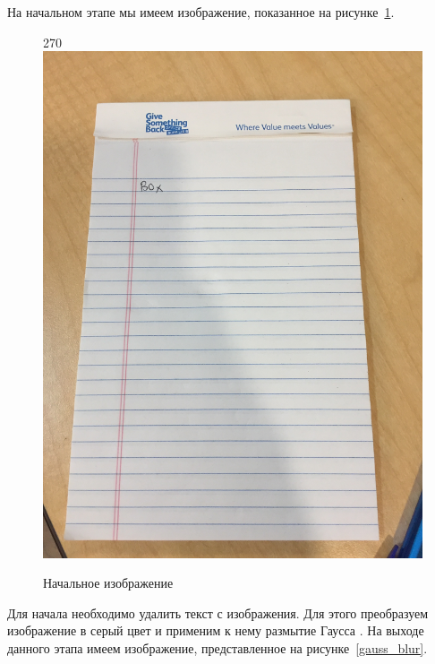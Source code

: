 На начальном этапе мы имеем изображение, показанное на рисунке~\ref{input}.

\begin{figure}
    \begin{turn}{270}
        \includegraphics[scale=0.05]{img/perspective/input.JPG}
    \end{turn}
    \caption{Начальное изображение}
    \label{input}
\end{figure}

Для начала необходимо удалить текст с изображения. Для этого преобразуем изображение в серый цвет и применим к нему размытие Гаусса \cite{gauss_blur}. На выходе данного этапа имеем изображение, представленное на рисунке~\ref{gauss_blur}.

